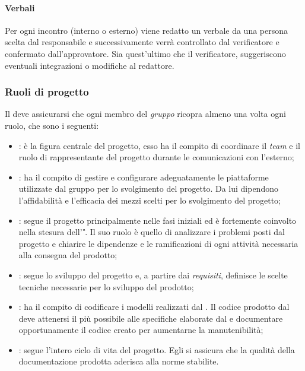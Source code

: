 	\paragraph{Verbali}
	Per ogni incontro (interno o esterno) viene redatto un verbale da una persona scelta dal responsabile e successivamente verrà controllato dal verificatore e confermato dall’approvatore. Sia quest'ultimo che il verificatore, suggeriscono eventuali integrazioni o modifiche al redattore.

\subsubsection{Ruoli di progetto} %
Il \RdP{} deve assicurarsi che ogni membro del \emph{gruppo} ricopra almeno una volta ogni ruolo, che sono i seguenti:
	\begin{itemize}
		\item \textbf{\RdP}: è la figura centrale del progetto, esso ha il compito di coordinare il \emph{team} e il ruolo di rappresentante del progetto durante le comunicazioni con l'esterno;
		\item \textbf{\Amm}: ha il compito di gestire e configurare adeguatamente le piattaforme utilizzate dal gruppo per lo svolgimento del progetto. Da lui dipendono l'affidabilità e l'efficacia dei mezzi scelti per lo svolgimento del progetto;
		\item \textbf{\Ana}: segue il progetto principalmente nelle fasi iniziali ed è fortemente coinvolto nella stesura dell' \AdR{}\textit{\G}. Il suo ruolo è quello di analizzare i problemi posti dal progetto e chiarire le dipendenze e le ramificazioni di ogni attività necessaria alla consegna del prodotto;
		\item \textbf{\Prog}: segue lo sviluppo del progetto e, a partire dai \emph{requisiti}, definisce le scelte tecniche necessarie per lo sviluppo del prodotto;
		\item \textbf{\Progm}: ha il compito di codificare i modelli realizzati dal \Prog{}. Il codice prodotto dal \Progm{} deve attenersi il più possibile alle specifiche elaborate dal \Prog{} e documentare opportunamente il codice creato per aumentarne la manutenibilità;
		\item \textbf{\Ver}: segue l'intero ciclo di vita del progetto. Egli si assicura che la qualità della documentazione prodotta aderisca alla norme stabilite.
	\end{itemize}

